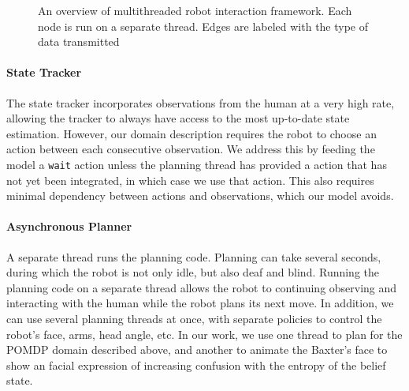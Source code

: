 \documentclass{article}
\begin{document}
\begin{multicols}{2}
\begin{figure}
\begin{center}
\caption{An overview of multithreaded robot interaction framework. Each node is run on a separate thread. Edges are labeled with the type of data transmitted}
\end{center}
\end{figure}




\paragraph{State Tracker} The state tracker incorporates observations from the human at a very high rate, allowing the tracker to always have access to the most up-to-date state estimation. However, our domain description requires the robot to choose an action between each consecutive observation. We address this by feeding the model a \texttt{wait} action unless the planning thread has provided a action that has not yet been integrated, in which case we use that action. This also requires minimal dependency between actions and observations, which our model avoids. 

\paragraph{Asynchronous Planner} A separate thread runs the planning code. Planning can take several seconds, during which the robot is not only idle, but also deaf and blind. Running the planning code on a separate thread allows the robot to continuing observing and interacting with the human while the robot plans its next move. In addition, we can use several planning threads at once, with separate policies to control the robot's face, arms, head angle, etc. In our work, we use one thread to plan for the POMDP domain described above, and another to animate the Baxter's face to show an facial expression of increasing confusion with the entropy of the belief state. 


\end{multicols}
\end{document}
